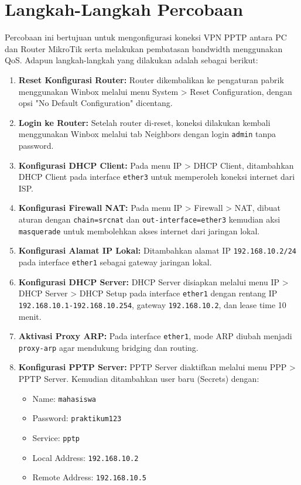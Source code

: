 \section{Langkah-Langkah Percobaan}
Percobaan ini bertujuan untuk mengonfigurasi koneksi VPN PPTP antara PC dan Router MikroTik serta melakukan pembatasan bandwidth menggunakan QoS. Adapun langkah-langkah yang dilakukan adalah sebagai berikut:

\begin{enumerate}
    \item \textbf{Reset Konfigurasi Router:} Router dikembalikan ke pengaturan pabrik menggunakan Winbox melalui menu System > Reset Configuration, dengan opsi "No Default Configuration" dicentang.
    
    \item \textbf{Login ke Router:} Setelah router di-reset, koneksi dilakukan kembali menggunakan Winbox melalui tab Neighbors dengan login \texttt{admin} tanpa password.
    
    \item \textbf{Konfigurasi DHCP Client:} Pada menu IP > DHCP Client, ditambahkan DHCP Client pada interface \texttt{ether3} untuk memperoleh koneksi internet dari ISP.
    
    \item \textbf{Konfigurasi Firewall NAT:} Pada menu IP > Firewall > NAT, dibuat aturan dengan \texttt{chain=srcnat} dan \texttt{out-interface=ether3} kemudian aksi \texttt{masquerade} untuk membolehkan akses internet dari jaringan lokal.
    
    \item \textbf{Konfigurasi Alamat IP Lokal:} Ditambahkan alamat IP \texttt{192.168.10.2/24} pada interface \texttt{ether1} sebagai gateway jaringan lokal.
    
    \item \textbf{Konfigurasi DHCP Server:} DHCP Server disiapkan melalui menu IP > DHCP Server > DHCP Setup pada interface \texttt{ether1} dengan rentang IP \texttt{192.168.10.1-192.168.10.254}, gateway \texttt{192.168.10.2}, dan lease time 10 menit.
    
    \item \textbf{Aktivasi Proxy ARP:} Pada interface \texttt{ether1}, mode ARP diubah menjadi \texttt{proxy-arp} agar mendukung bridging dan routing.
    
    \item \textbf{Konfigurasi PPTP Server:} PPTP Server diaktifkan melalui menu PPP > PPTP Server. Kemudian ditambahkan user baru (Secrets) dengan:
    \begin{itemize}
        \item Name: \texttt{mahasiswa}
        \item Password: \texttt{praktikum123}
        \item Service: \texttt{pptp}
        \item Local Address: \texttt{192.168.10.2}
        \item Remote Address: \texttt{192.168.10.5}
    \end{itemize}
    

\end{enumerate}
